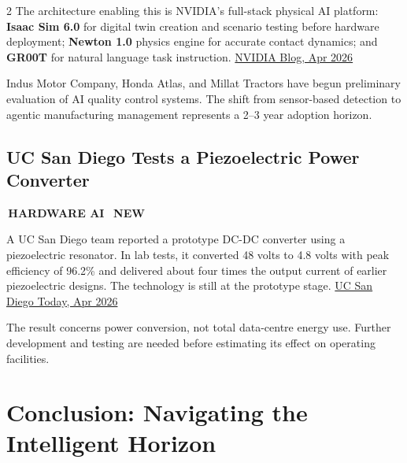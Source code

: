 \documentclass[10pt, a4paper]{article}
\newcommand{\sectiontag}[1]{%
  \noindent\colorbox{cobalt}{%
    \,\footnotesize\bfseries\color{white}\MakeUppercase{#1}\,}\,%
}
\newcommand{\newtag}{%
  \colorbox{emerald}{\,\scriptsize\bfseries\color{white}NEW\,}\ %
}
\newcommand{\ruled}{%
  \par\vspace{0.3em}%
  \noindent{\color{electric}\rule{\linewidth}{0.4pt}}\par
  \vspace{0.3em}}
\begin{document}
\begin{multicols}{2}
{The architecture enabling this is NVIDIA's full-stack physical AI platform: \textbf{Isaac Sim 6.0} for digital twin creation and scenario testing before hardware deployment; \textbf{Newton 1.0} physics engine for accurate contact dynamics; and \textbf{GR00T} for natural language task instruction.
\href{https://blogs.nvidia.com/blog/national-robotics-week-2026/}{NVIDIA Blog, Apr 2026}
}

\begin{insightbox}[title={\faCar\quad Pakistan Manufacturing Sector}]
  {\small Indus Motor Company, Honda Atlas, and Millat Tractors have begun preliminary evaluation of AI quality control systems. The shift from sensor-based detection to agentic manufacturing management represents a 2--3 year adoption horizon.}
\end{insightbox}

\ruled

\subsection{UC San Diego Tests a Piezoelectric Power Converter}

\sectiontag{Hardware AI}\quad\newtag

\medskip
{\small
A UC San Diego team reported a prototype DC-DC converter using a piezoelectric resonator. In lab tests, it converted 48 volts to 4.8 volts with peak efficiency of 96.2\% and delivered about four times the output current of earlier piezoelectric designs. The technology is still at the prototype stage.
\href{https://today.ucsd.edu/story/new-chip-design-could-boost-efficiency-of-power-management-in-data-centers}{UC San Diego Today, Apr 2026}

The result concerns power conversion, not total data-centre energy use. Further development and testing are needed before estimating its effect on operating facilities.
}

\end{multicols}

\clearpage

\section{Conclusion: Navigating the Intelligent Horizon}
\end{document}
